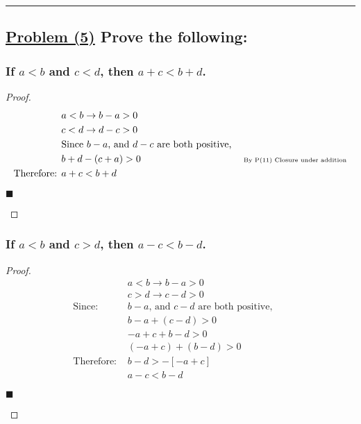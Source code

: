 \documentclass[letterpaper, 10 pt, conference]{ieeeconf}  %
\begin{document}
\noindent\rule{8cm}{0.4pt}

\begin{figure}[thpb]
      \centering
\end{figure}
\subsection{\textbf{\underline{Problem (5)} Prove the following:}}

\subsubsection{\textbf{If $a < b$ and $c < d$, then $a + c < b + d$.}}

\begin{proof}
\begin{align}
    &a < b \rightarrow b - a > 0 &&\\
    &c < d \rightarrow d - c > 0 &&\\
    &\text{\small{Since $b -a$, and $d - c $ are both positive,}} &&\\
    &b + d - (c + a) > 0 && \text{\tiny{ By P(11) Closure under addition}} \\
    \text{Therefore: } &a + c < b + d &&
\end{align}
\begin{flushright}
$\blacksquare$
\end{flushright}
\end{proof}


\subsubsection{\textbf{If $a < b$ and $c > d$, then $a - c < b - d$.}}

\begin{proof}
\begin{align}
    &a < b \rightarrow b - a > 0 &&\\
    &c > d \rightarrow c - d > 0 &&\\
    \text{Since: }&\text{$b - a$, and $c - d$ are both positive,} &&\\
    &b - a + (c - d) > 0 && \\
    &-a + c + b - d > 0 &&\\
    &(-a + c) + (b - d) > 0 &&\\
    \text{Therefore: } & b - d > - [-a + c]&&\\
    & a - c < b - d&&
\end{align}
\begin{flushright}
$\blacksquare$
\end{flushright}
\end{proof}
\end{document}
